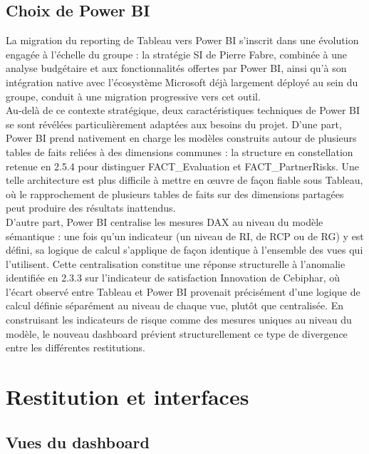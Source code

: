 \subsection{Choix de Power BI}

La migration du reporting de Tableau vers Power BI s'inscrit dans une évolution engagée 
à l'échelle du groupe : la stratégie SI de Pierre Fabre, combinée à une analyse budgétaire et 
aux fonctionnalités offertes par Power BI, ainsi qu'à son intégration native avec l'écosystème 
Microsoft déjà largement déployé au sein du groupe, conduit à une migration progressive vers 
cet outil. \\

Au-delà de ce contexte stratégique, deux caractéristiques techniques de Power BI se 
sont révélées particulièrement adaptées aux besoins du projet. D'une part, Power BI prend 
nativement en charge les modèles construits autour de plusieurs tables de faits reliées à des 
dimensions communes : la structure en constellation retenue en 2.5.4 pour distinguer 
FACT\_Evaluation et FACT\_PartnerRisks. Une telle architecture est plus difficile à mettre en 
œuvre de façon fiable sous Tableau, où le rapprochement de plusieurs tables de faits sur des 
dimensions partagées peut produire des résultats inattendus. \\

D'autre part, Power BI centralise les mesures DAX au niveau du modèle sémantique : 
une fois qu'un indicateur (un niveau de RI, de RCP ou de RG) y est défini, sa logique de 
calcul s'applique de façon identique à l'ensemble des vues qui l'utilisent. Cette centralisation 
constitue une réponse structurelle à l'anomalie identifiée en 2.3.3 sur l'indicateur de 
satisfaction Innovation de Cebiphar, où l'écart observé entre Tableau et Power BI provenait 
précisément d'une logique de calcul définie séparément au niveau de chaque vue, plutôt que 
centralisée. En construisant les indicateurs de risque comme des mesures uniques au 
niveau du modèle, le nouveau dashboard prévient structurellement ce type de divergence 
entre les différentes restitutions.

\section{Restitution et interfaces}
\subsection{Vues du dashboard}

